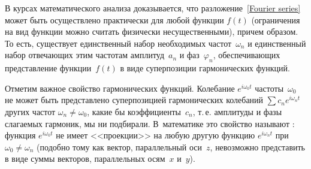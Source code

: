 В курсах математического анализа доказывается, что
разложение~\eqref{Fourier series} может быть осуществлено 
практически для любой функции $f(t)$
(ограничения на вид функции можно считать физически несущественными), 
причем  образом.
То есть, существует единственный набор необходимых частот~$\omega_n$ и
единственный набор отвечающих этим частотам амплитуд~$a_n$ и фаз~$\varphi_n$,
обеспечивающих представление функции~$f(t)$ в виде суперпозиции гармонических
функций. 

\begin{lab:note}
Отметим важное свойство гармонических функций.
Колебание $e^{i\omega_0 t}$ частоты~$\omega_0$ не может быть
представлено суперпозицией гармонических колебаний $\sum c_n e^{i\omega_n t}$
других частот $\omega_n\ne\omega_0$, какие бы коэффициенты~$c_n$, т.\,е.
амплитуды и фазы слагаемых гармоник, мы ни подбирали. В~математике это
свойство называют : функция $e^{i\omega_0 t}$
не имеет <<проекции>> на любую другую функцию $e^{i\omega_nt}$ при
$\omega_0\ne\omega_n$ (подобно тому как вектор, параллельный оси~$z$,
невозможно представить в виде суммы векторов, параллельных осям~$x$ и~$y$).
\end{lab:note}

